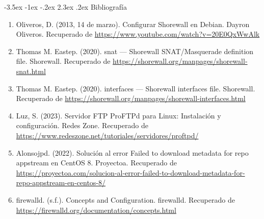 \documentclass[11pt]{report}
\makeatletter
\renewcommand\chapter{\@startsection{chapter}{0}{\z@}%
    {-3.5ex \@plus -1ex \@minus -.2ex}%
    {2.3ex \@plus.2ex}%
    {\normalfont\Large\bfseries}}
\makeatother
\begin{document}
\cleardoublepage

\chapter{Bibliografía} %
\begin{enumerate}
\item Oliveros, D. (2013, 14 de marzo). Configurar Shorewall en Debian. Dayron Oliveros. Recuperado de \url{https://www.youtube.com/watch?v=20E0QxWwAlk}
\item Thomas M. Eastep. (2020). snat — Shorewall SNAT/Masquerade definition file. Shorewall. Recuperado de \url{https://shorewall.org/manpages/shorewall-snat.html}
\item Thomas M. Eastep. (2020). interfaces — Shorewall interfaces file. Shorewall. Recuperado de \url{https://shorewall.org/manpages/shorewall-interfaces.html}
\item Luz, S. (2023). Servidor FTP ProFTPd para Linux: Instalación y configuración. Redes Zone. Recuperado de \url{https://www.redeszone.net/tutoriales/servidores/proftpd/}
\item Alonsojpd. (2022). Solución al error Failed to download metadata for repo appstream en CentOS 8. Proyectoa. Recuperado de \url{https://proyectoa.com/solucion-al-error-failed-to-download-metadata-for-repo-appstream-en-centos-8/}
\item firewalld. (s.f.). Concepts and Configuration. firewalld. Recuperado de \url{https://firewalld.org/documentation/concepts.html}
\end{enumerate}
\end{document}
